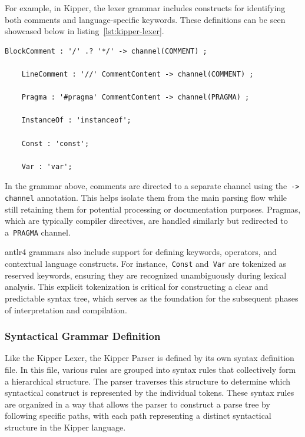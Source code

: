 For example, in Kipper, the lexer grammar includes constructs for identifying both comments and language-specific keywords. These definitions can be seen showcased below in listing~\ref{lst:kipper-lexer}.

\begin{lstlisting}[language=antlr4, caption={Sample snippet from Kipper Lexer grammar}, label={lst:kipper-lexer}]
	BlockComment : '/' .? '*/' -> channel(COMMENT) ;
	
	LineComment : '//' CommentContent -> channel(COMMENT) ;
	
	Pragma : '#pragma' CommentContent -> channel(PRAGMA) ;
	
	InstanceOf : 'instanceof';
	
	Const : 'const';
	
	Var : 'var';
\end{lstlisting}

In the grammar above, comments are directed to a separate channel using the~\lstinline|-> channel| annotation. This helps isolate them from the main parsing flow while still retaining them for potential processing or documentation purposes. Pragmas, which are typically compiler directives, are handled similarly but redirected to a~\lstinline|PRAGMA| channel.

\Gls{antlr4} grammars also include support for defining keywords, operators, and contextual language constructs. For instance,~\lstinline|Const| and~\lstinline|Var| are tokenized as reserved keywords, ensuring they are recognized unambiguously during lexical analysis. This explicit tokenization is critical for constructing a clear and predictable syntax tree, which serves as the foundation for the subsequent phases of interpretation and compilation.

\subsubsection{Syntactical Grammar Definition}
\label{sec:parser-grammar-definition}

Like the Kipper Lexer, the Kipper Parser is defined by its own syntax definition file. In this file, various rules are grouped into syntax rules that collectively form a hierarchical structure. The parser traverses this structure to determine which syntactical construct is represented by the individual tokens. These syntax rules are organized in a way that allows the parser to construct a parse tree by following specific paths, with each path representing a distinct syntactical structure in the Kipper language.

